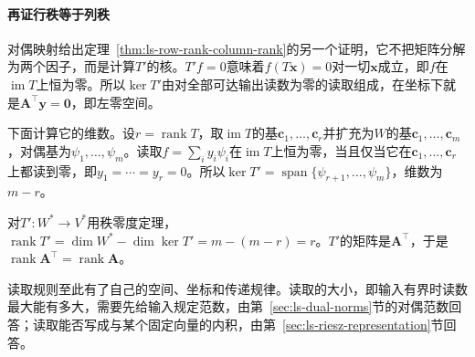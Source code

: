 \paragraph{再证行秩等于列秩}
对偶映射给出定理~\ref{thm:ls-row-rank-column-rank}的另一个证明，它不把矩阵分解为两个因子，而是计算$T'$的核。$T'f=0$意味着$f(T\bm x)=0$对一切$\bm x$成立，即$f$在$\operatorname{im}T$上恒为零。所以$\ker T'$由对全部可达输出读数为零的读取组成，在坐标下就是$\bm A^\top\bm y=\bm0$，即左零空间。

下面计算它的维数。设$r=\operatorname{rank}T$，取$\operatorname{im}T$的基$\bm c_1,\ldots,\bm c_r$并扩充为$W$的基$\bm c_1,\ldots,\bm c_m$，对偶基为$\psi_1,\ldots,\psi_m$。读取$f=\sum_iy_i\psi_i$在$\operatorname{im}T$上恒为零，当且仅当它在$\bm c_1,\ldots,\bm c_r$上都读到零，即$y_1=\cdots=y_r=0$。所以$\ker T'=\operatorname{span}\{\psi_{r+1},\ldots,\psi_m\}$，维数为$m-r$。

对$T':W^*\to V^*$用秩零度定理，$\operatorname{rank}T'=\dim W^*-\dim\ker T'=m-(m-r)=r$。$T'$的矩阵是$\bm A^\top$，于是$\operatorname{rank}\bm A^\top=\operatorname{rank}\bm A$。

读取规则至此有了自己的空间、坐标和传递规律。读取的大小，即输入有界时读数最大能有多大，需要先给输入规定范数，由第~\ref{sec:ls-dual-norms}节的对偶范数回答；读取能否写成与某个固定向量的内积，由第~\ref{sec:ls-riesz-representation}节回答。
